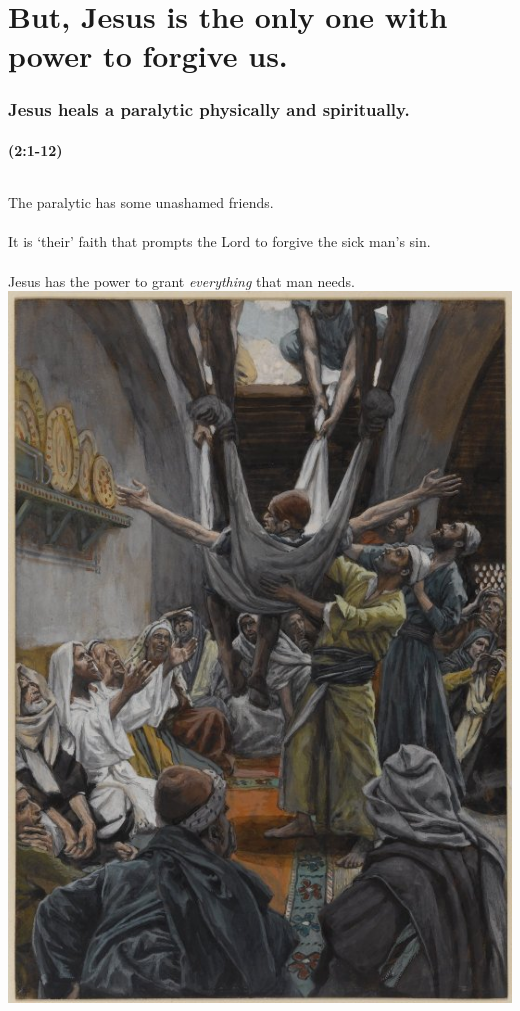 \documentclass{beamer}
\begin{document}
\section{But, Jesus is the only one with power to forgive us.}
\begin{frame}
\frametitle{Jesus heals a paralytic physically and spiritually.}
\framesubtitle{(2:1-12)}
\begin{columns}
\column{5cm}
The paralytic has some unashamed friends.\\~\\
It is `their' faith that prompts the Lord to forgive the sick man's sin.\\~\\
Jesus has the power to grant \emph{everything} that man needs.
\column{5cm}
\includegraphics[width=\textwidth]{graphics/paralytic.jpg}
\end{columns}
\end{frame}
\end{document}
